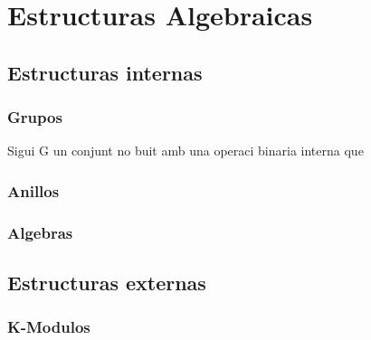 \chapter{Estructuras Algebraicas}

\section{Estructuras internas}

\subsection{Grupos}
\label{ss_groups}


Sigui G un conjunt no buit amb una operaci binaria interna que 

\subsection{Anillos}
\label{}



\subsection{Algebras}
\label{}


\section{Estructuras externas}

\subsection{K-Modulos}




